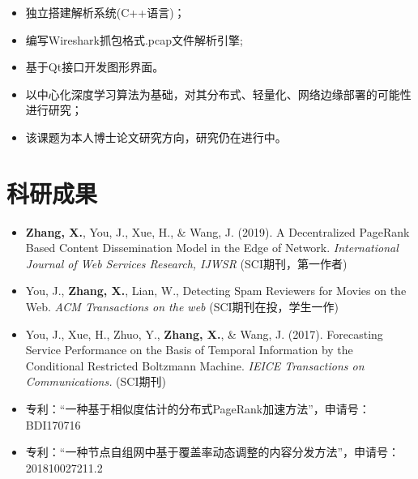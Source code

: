 \documentclass{resume}
\begin{document}
\begin{itemize}
  \item 独立搭建解析系统(C++语言)；
  \item 编写Wireshark抓包格式.pcap文件解析引擎;
  \item 基于Qt接口开发图形界面。
\end{itemize}

\begin{itemize}
  \item 以中心化深度学习算法为基础，对其分布式、轻量化、网络边缘部署的可能性进行研究；
  \item 该课题为本人博士论文研究方向，研究仍在进行中。
\end{itemize}




\section{科研成果}
\begin{itemize}[parsep=0.5ex]
  \item \textbf{Zhang, X.}, You, J., Xue, H., \& Wang, J. (2019). A Decentralized PageRank Based Content Dissemination Model in the Edge of Network. \textit{International Journal of Web Services Research, IJWSR} (SCI期刊，第一作者)
  \item You, J., \textbf{Zhang, X.}, Lian, W., Detecting Spam Reviewers for Movies on the Web. \textit{ACM Transactions on the web} (SCI期刊在投，学生一作)
  \item You, J., Xue, H., Zhuo, Y., \textbf{Zhang, X.}, \& Wang, J. (2017). Forecasting Service Performance on the Basis of Temporal Information by the Conditional Restricted Boltzmann Machine. \textit{IEICE Transactions on Communications.} (SCI期刊)
  \item 专利：“一种基于相似度估计的分布式PageRank加速方法”，申请号：BDI170716
  \item 专利：“一种节点自组网中基于覆盖率动态调整的内容分发方法”，申请号：201810027211.2
\end{itemize}
\end{document}

